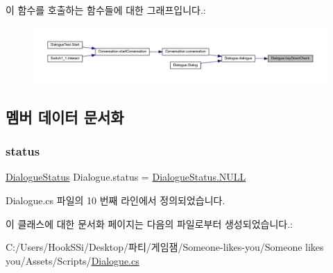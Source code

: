 이 함수를 호출하는 함수들에 대한 그래프입니다.\+:\nopagebreak
\begin{figure}[H]
\begin{center}
\leavevmode
\includegraphics[width=350pt]{d0/d9d/class_dialogue_adc5315af502ab7bd4a3540b7d30ed023_icgraph}
\end{center}
\end{figure}


\subsection{멤버 데이터 문서화}
\mbox{\label{class_dialogue_a8a603464c7f617f5fd96e4c2191034d5}} 
\subsubsection{\texorpdfstring{status}{status}}
{\footnotesize\ttfamily \mbox{\hyperlink{class_dialogue_a4fc50ccc0dec0191d8e89bb8cf1b9431}{Dialogue\+Status}} Dialogue.\+status = \mbox{\hyperlink{class_dialogue_a4fc50ccc0dec0191d8e89bb8cf1b9431a6c3e226b4d4795d518ab341b0824ec29}{Dialogue\+Status.\+N\+U\+LL}}\hspace{0.3cm}{\ttfamily [private]}}



Dialogue.\+cs 파일의 10 번째 라인에서 정의되었습니다.



이 클래스에 대한 문서화 페이지는 다음의 파일로부터 생성되었습니다.\+:\begin{DoxyCompactItemize}
\item 
C\+:/\+Users/\+Hook\+S\+Si/\+Desktop/파티/게임잼/\+Someone-\/likes-\/you/\+Someone likes you/\+Assets/\+Scripts/\mbox{\hyperlink{_dialogue_8cs}{Dialogue.\+cs}}\end{DoxyCompactItemize}
